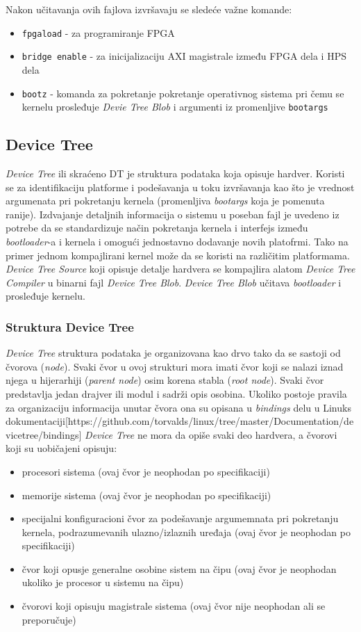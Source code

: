 Nakon učitavanja ovih fajlova izvršavaju se sledeće važne komande:
\begin{itemize}
\item \texttt{fpgaload} - za programiranje FPGA
\item \texttt{bridge enable} - za inicijalizaciju AXI magistrale između FPGA dela i HPS dela
\item \texttt{bootz} - komanda za pokretanje pokretanje operativnog sistema pri čemu se kernelu prosleđuje \textit{Devie Tree Blob} i argumenti iz promenljive \texttt{bootargs}
\end{itemize}

\subsection{Device Tree}
\textit{Device Tree} ili skraćeno DT je struktura podataka koja opisuje hardver. Koristi se za identifikaciju platforme i podešavanja u toku izvršavanja kao što je vrednost argumenata pri pokretanju kernela (promenljiva \textit{bootargs} koja je pomenuta ranije). Izdvajanje detaljnih informacija o sistemu u poseban fajl je uvedeno iz potrebe da se standardizuje način pokretanja kernela i interfejs između \textit{bootloader}-a i kernela i omogući jednostavno dodavanje novih platofrmi. Tako na primer jednom kompajlirani kernel može da se koristi na različitim platformama. \textit{Device Tree Source} koji opisuje detalje hardvera se kompajlira alatom \textit{Device Tree Compiler} u binarni fajl \textit{Device Tree Blob}. \textit{Device Tree Blob} učitava \textit{bootloader} i prosleđuje kernelu.
\subsubsection{Struktura Device Tree}
\textit{Device Tree} struktura podataka je organizovana kao drvo tako da se sastoji od čvorova (\textit{node}). Svaki čvor u ovoj strukturi mora imati čvor koji se nalazi iznad njega u hijerarhiji (\textit{parent node}) osim korena stabla (\textit{root node}). Svaki čvor predstavlja jedan drajver ili modul i sadrži opis osobina. Ukoliko postoje pravila za organizaciju informacija unutar čvora ona su opisana u \textit{bindings} delu u Linuks dokumentaciji[https://github.com/torvalds/linux/tree/master/Documentation/devicetree/bindings] \textit{Device Tree} ne mora da opiše svaki deo hardvera, a čvorovi koji su uobičajeni opisuju:
\begin{itemize}
\item procesori sistema (ovaj čvor je neophodan po specifikaciji)
\item memorije sistema (ovaj čvor je neophodan po specifikaciji)
\item specijalni konfiguracioni čvor za podešavanje argumemnata pri pokretanju kernela, podrazumevanih ulazno/izlaznih uređaja (ovaj čvor je neophodan po specifikaciji)
\item čvor koji opusje generalne osobine sistem na čipu (ovaj čvor je neophodan ukoliko je procesor u sistemu na čipu)
\item čvorovi koji opisuju magistrale sistema (ovaj čvor nije neophodan ali se preporučuje)
\end{itemize}

